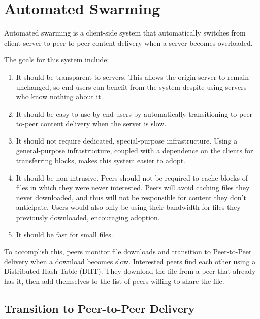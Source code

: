 \chapter {Automated Swarming}\label{section:solution}

Automated swarming is a client-side system that automatically switches from client-server to peer-to-peer content delivery when a server becomes overloaded.  

The goals for this system include:
\begin{enumerate}
\item It should be transparent to servers.  This allows the origin server to remain unchanged, so end users can benefit from the system despite using servers who know nothing about it.
\item It should be easy to use by end-users by automatically transitioning to peer-to-peer content delivery when the server is slow.
\item It should not require dedicated, special-purpose infrastructure.  Using a general-purpose infrastructure, coupled with a dependence on the clients for transferring blocks,
makes this system easier to adopt.
\item It should be non-intrusive.  Peers should not be required to cache blocks of files in which they were never interested.  
Peers will avoid caching files they never downloaded, and thus will not be responsible for content they don't anticipate.  
Users would also only be using their bandwidth for files they previously downloaded, encouraging adoption.
\item It should be fast for small files.
\end{enumerate}

To accomplish this, peers monitor file downloads and transition to Peer-to-Peer delivery when a download becomes slow.
Interested peers find each other using a Distributed Hash Table (DHT).
They download the file from a peer that already has it, then add themselves to the list of peers willing to share the file.

\section{Transition to Peer-to-Peer Delivery}

